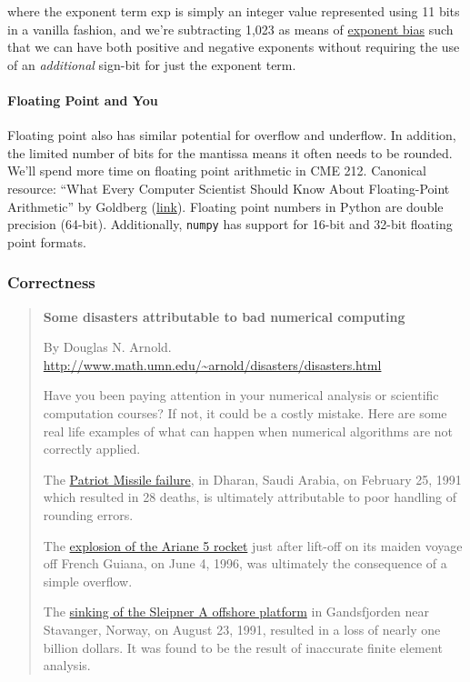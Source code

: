 \documentclass[12pt,letterpaper,twoside]{article}
\begin{document}
where the exponent term $\textrm{exp}$ is simply an integer value
represented using 11 bits in a vanilla fashion, and we're subtracting
1,023 as means of
\href{https://en.wikipedia.org/wiki/Exponent_bias}{exponent bias} such
that we can have both positive and negative exponents without
requiring the use of an \emph{additional} sign-bit for just the
exponent term.

\paragraph{Floating Point and You}
Floating point also has similar potential for overflow and underflow.
In addition, the limited number of bits for the mantissa means it
often needs to be rounded.
We'll spend more time on floating point arithmetic in CME 212.
Canonical resource: ``What Every Computer Scientist Should Know About
Floating-Point Arithmetic'' by Goldberg
(\href{https://ece.uwaterloo.ca/~dwharder/NumericalAnalysis/02Numerics/Double/paper.pdf}{link}).
Floating point numbers in Python are double precision (64-bit).
Additionally, \texttt{numpy} has support for 16-bit and 32-bit floating point formats.

\vspace{-2ex}
\subsubsection{Correctness}

{
  \small
\begin{quote}
\textbf{Some disasters attributable to bad numerical computing}

By Douglas N. Arnold.
{\footnotesize \url{http://www.math.umn.edu/~arnold/disasters/disasters.html}}

Have you been paying attention in your numerical analysis or scientific
computation courses? If not, it could be a costly mistake. Here are some
real life examples of what can happen when numerical algorithms are not
correctly applied.

The
\href{http://www-users.math.umn.edu/~arnold/disasters/patriot.html}{Patriot
  Missile failure},
in Dharan, Saudi Arabia, on February 25,
1991 which resulted in 28 deaths, is ultimately attributable to poor
handling of rounding errors.

The \href{http://www-users.math.umn.edu/~arnold/disasters/ariane.html}{explosion of the Ariane 5 rocket} just after lift-off on its maiden
voyage off French Guiana, on June 4, 1996, was ultimately the
consequence of a simple overflow.

The
\href{http://www-users.math.umn.edu/~arnold/disasters/sleipner.html}{sinking
  of the Sleipner A offshore platform}
in Gandsfjorden near
Stavanger, Norway, on August 23, 1991, resulted in a loss of nearly one
billion dollars. It was found to be the result of inaccurate finite
element analysis.
\end{quote}
}
\end{document}
